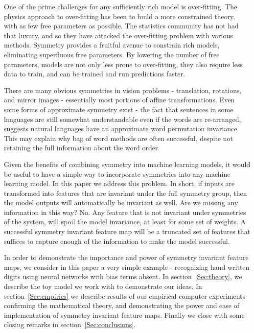 \documentclass[twocolumn, prl]{revtex4-1}
\begin{document}

One of the prime challenges for any sufficiently rich model is over-fitting. The physics approach to over-fitting has been to build a more constrained theory, with as few free parameters as possible. The statistics community has not had that luxury, and so they have attacked the over-fitting problem with various methods. Symmetry provides a fruitful avenue to constrain rich models, eliminating superfluous free parameters. By lowering the number of free parameters, models are not only less prone to over-fitting, they also require less data to train, and can be trained and run predictions faster.


There are many obvious symmetries in vision problems - translation, rotations, and mirror images - essentially most portions of affine transformations\cite{gens2014deep, dieleman2016exploiting, cohen2016group, henriques2016warped}. Even some forms of approximate symmetry exist\cite{kiddonsymmetry} - the fact that sentences in some languages are still somewhat understandable even if the words are re-arranged, suggests natural languages have an approximate word permutation invariance. This may explain why bag of word methods are often successful, despite not retaining the full information about the word order. 

Given the benefits of combining symmetry into machine learning models, it would be useful to have a simple way to incorporate symmetries into any machine learning model. In this paper we address this problem. In short, if inputs are transformed into features that are invariant under the full symmetry group, then the model outputs will automatically be invariant as well. Are we missing any information in this way? No. Any feature that is not invariant under symmetries of the system, will spoil the model invariance, at least for some set of weights. A successful symmetry invariant feature map will be a truncated set of features that suffices to capture enough of the information to make the model successful.

In order to demonstrate the importance and power of symmetry invariant feature maps, we consider in this paper a very simple example - recognizing hand written digits using neural networks with bias terms absent. In section~\ref{Sec:theory}, we describe the toy model we work with to demonstrate our ideas. In section~\ref{Sec:empirics} we describe results of our empirical computer experiments confirming the mathematical theory, and demonstrating the power and ease of implementation of symmetry invariant feature maps. Finally we close with some closing remarks in section~\ref{Sec:conclusions}.
\end{document}
